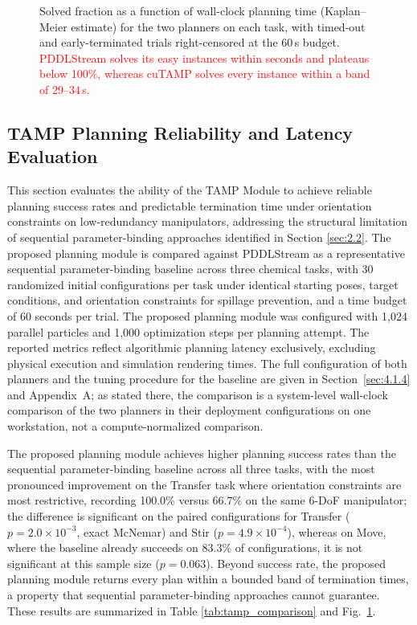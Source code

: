 \documentclass{ieeeaccess}
\newif\ifhighlight
\newcommand{\rev}[1]{\ifhighlight\hl{#1}\else#1\fi}
\newcommand{\nd}[1]{\textcolor{red}{#1}}
\newcommand{\revbox}[1]{\ifhighlight\noindent\colorbox{yellow}{\parbox{\dimexpr\linewidth-2\fboxsep\relax}{#1}}\else#1\fi}
\begin{document}
\begin{figure}[!t]
\centering
\revbox{%
\fbox{\parbox[c][0.6\linewidth][c]{\dimexpr\linewidth-2\fboxsep-2\fboxrule\relax}{\centering\nd{Figure placeholder: Kaplan--Meier solved fraction versus wall-clock planning time for PDDLStream and cuTAMP on Transfer, Move, and Stir (30 paired configurations each, 60\,s budget), generated from the planning logs.}}}
\caption{Solved fraction as a function of wall-clock planning time (Kaplan--Meier estimate) for the two planners on each task, with timed-out and early-terminated trials right-censored at the 60\,s budget. \nd{PDDLStream solves its easy instances within seconds and plateaus below 100\%, whereas cuTAMP solves every instance within a band of 29--34\,s.}}
\label{fig:km}}
\end{figure}

\subsection{TAMP Planning Reliability and Latency Evaluation}\label{sec:4.3}
This section evaluates the ability of the TAMP Module to achieve reliable planning success rates and predictable termination time under orientation constraints on low-redundancy manipulators, addressing the structural limitation of sequential parameter-binding approaches identified in Section \ref{sec:2.2}. The proposed planning module is compared against PDDLStream as a representative sequential parameter-binding baseline across three chemical tasks, with 30 randomized initial configurations per task under identical starting poses, target conditions, and orientation constraints for spillage prevention, and a time budget of 60 seconds per trial. The proposed planning module was configured with 1,024 parallel particles and 1,000 optimization steps per planning attempt.
The reported metrics reflect algorithmic planning latency exclusively, excluding physical execution and simulation rendering times.
\rev{The full configuration of both planners and the tuning procedure for the baseline are given in Section~\ref{sec:4.1.4} and Appendix~A; as stated there, the comparison is a system-level wall-clock comparison of the two planners in their deployment configurations on one workstation, not a compute-normalized comparison.}

The proposed planning module achieves higher planning success rates than the sequential parameter-binding baseline across all three tasks, with the most pronounced improvement on the Transfer task where orientation constraints are most restrictive, recording 100.0\% versus 66.7\% on the same 6-DoF manipulator\rev{; the difference is significant on the paired configurations for Transfer ($p = 2.0\times10^{-3}$, exact McNemar) and Stir ($p = 4.9\times10^{-4}$), whereas on Move, where the baseline already succeeds on 83.3\% of configurations, it is not significant at this sample size ($p = 0.063$)}.
Beyond success rate, the proposed planning module \rev{returns every plan within a bounded band of termination times}, a property that sequential parameter-binding approaches cannot guarantee.
These results are summarized in Table \ref{tab:tamp_comparison} \rev{and Fig.~\ref{fig:km}}.
\end{document}
